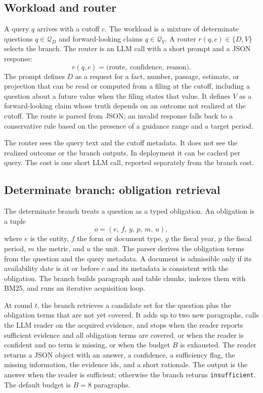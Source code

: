 \documentclass[11pt]{article}
\begin{document}
\subsection{Workload and router}
A query $q$ arrives with a cutoff $c$. The workload is a mixture of determinate questions $q\in\mathcal Q_D$ and forward-looking claims $q\in\mathcal Q_V$. A router $r(q,c)\in\{D,V\}$ selects the branch. The router is an LLM call with a short prompt and a JSON response:
\begin{equation}
r(q,c)=\bigl(\text{route},\ \text{confidence},\ \text{reason}\bigr).
\end{equation}
The prompt defines $D$ as a request for a fact, number, passage, estimate, or projection that can be read or computed from a filing at the cutoff, including a question about a future value when the filing states that value. It defines $V$ as a forward-looking claim whose truth depends on an outcome not realized at the cutoff. The route is parsed from JSON; an invalid response falls back to a conservative rule based on the presence of a guidance range and a target period.

The router sees the query text and the cutoff metadata. It does not see the realized outcome or the branch outputs. In deployment it can be cached per query. The cost is one short LLM call, reported separately from the branch cost.

\subsection{Determinate branch: obligation retrieval}
The determinate branch treats a question as a typed obligation. An obligation is a tuple
\begin{equation}
o=(e,\,f,\,y,\,p,\,m,\,u),
\end{equation}
where $e$ is the entity, $f$ the form or document type, $y$ the fiscal year, $p$ the fiscal period, $m$ the metric, and $u$ the unit. The parser derives the obligation terms from the question and the query metadata. A document is admissible only if its availability date is at or before $c$ and its metadata is consistent with the obligation. The branch builds paragraph and table chunks, indexes them with BM25, and runs an iterative acquisition loop.

At round $t$, the branch retrieves a candidate set for the question plus the obligation terms that are not yet covered. It adds up to two new paragraphs, calls the LLM reader on the acquired evidence, and stops when the reader reports sufficient evidence and all obligation terms are covered, or when the reader is confident and no term is missing, or when the budget $B$ is exhausted. The reader returns a JSON object with an answer, a confidence, a sufficiency flag, the missing information, the evidence ids, and a short rationale. The output is the answer when the reader is sufficient; otherwise the branch returns \texttt{insufficient}. The default budget is $B=8$ paragraphs.
\end{document}

